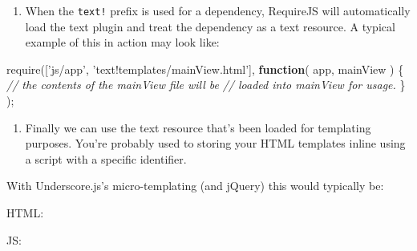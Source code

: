 \documentclass[9pt]{book}
\newenvironment{Shaded}{}{}
\newcommand{\KeywordTok}[1]{\textcolor[rgb]{0.00,0.44,0.13}{\textbf{{#1}}}}
\newcommand{\StringTok}[1]{\textcolor[rgb]{0.25,0.44,0.63}{{#1}}}
\newcommand{\CommentTok}[1]{\textcolor[rgb]{0.38,0.63,0.69}{\textit{{#1}}}}
\newcommand{\OtherTok}[1]{\textcolor[rgb]{0.00,0.44,0.13}{{#1}}}
\newcommand{\FunctionTok}[1]{\textcolor[rgb]{0.02,0.16,0.49}{{#1}}}
\newcommand{\ErrorTok}[1]{\textcolor[rgb]{1.00,0.00,0.00}{\textbf{{#1}}}}
\newcommand{\NormalTok}[1]{{#1}}
\begin{document}
\begin{enumerate}
\def\labelenumi{\arabic{enumi}.}
\setcounter{enumi}{2}
\itemsep1pt\parskip0pt
\item
  When the \texttt{text!} prefix is used for a dependency, RequireJS
  will automatically load the text plugin and treat the dependency as a
  text resource. A typical example of this in action may look like:
\end{enumerate}

\begin{Shaded}
\begin{Highlighting}[]
\FunctionTok{require}\NormalTok{([}\StringTok{'js/app'}\NormalTok{, }\StringTok{'text!templates/mainView.html'}\NormalTok{],}
    \KeywordTok{function}\NormalTok{( app, mainView ) \{}
        \CommentTok{// the contents of the mainView file will be}
        \CommentTok{// loaded into mainView for usage.}
    \NormalTok{\}}
\NormalTok{);}
\end{Highlighting}
\end{Shaded}

\begin{enumerate}
\def\labelenumi{\arabic{enumi}.}
\setcounter{enumi}{3}
\itemsep1pt\parskip0pt
\item
  Finally we can use the text resource that's been loaded for templating
  purposes. You're probably used to storing your HTML templates inline
  using a script with a specific identifier.
\end{enumerate}

With Underscore.js's micro-templating (and jQuery) this would typically
be:

HTML:

\begin{Shaded}
\end{Shaded}

JS:

\begin{Shaded}
\end{Shaded}
\end{document}
